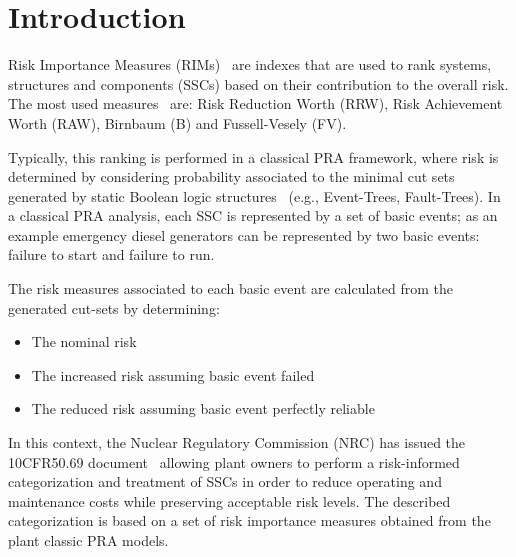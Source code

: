 \section{Introduction}
\label{sec:introduction}

Risk Importance Measures (RIMs)~\cite{Nureg3385} are indexes that are used to rank systems, 
structures and components (SSCs) based on their contribution to the overall risk. 
The most used measures~\cite{flemingRiskImportance} are: 
Risk Reduction Worth (RRW), Risk Achievement Worth (RAW), Birnbaum (B) and Fussell-Vesely (FV).

Typically, this ranking is performed in a classical PRA framework, where risk is determined by 
considering probability associated to the minimal cut sets generated by static Boolean logic 
structures~\cite{Nureg1150} (e.g., Event-Trees, Fault-Trees). In a classical PRA analysis, 
each SSC is represented by a set of basic events; as an example emergency diesel generators can be 
represented by two basic events: failure to start and failure to run. 

The risk measures associated to each basic event are calculated from the generated cut-sets 
by determining: 
\begin{itemize}
  \item The nominal risk 
  \item The increased risk assuming basic event failed
  \item The reduced risk assuming basic event perfectly reliable 
\end{itemize}

In this context, the Nuclear Regulatory Commission (NRC) has issued the 10CFR50.69 
document~\cite{NRC5069} allowing plant owners to perform a risk-informed categorization and 
treatment of SSCs in order to reduce operating and maintenance costs while preserving 
acceptable risk levels. The described categorization is based on a set of risk importance 
measures obtained from the plant classic PRA models.

